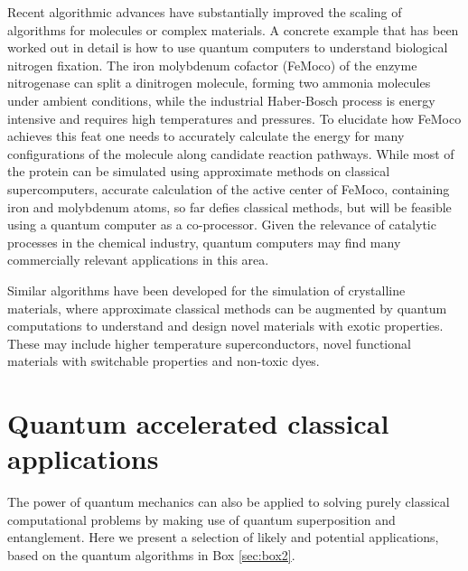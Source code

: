 \documentclass[journal]{IEEEtran}
\begin{document}
Recent algorithmic advances have substantially improved the scaling of algorithms for molecules or complex materials. A concrete example that has been worked out in detail  \cite{nitrogenase} is how to use quantum computers to understand biological nitrogen fixation. 
The iron molybdenum cofactor (FeMoco) of the enzyme nitrogenase can split a dinitrogen molecule, forming two ammonia molecules under ambient conditions, while the industrial Haber-Bosch process is energy intensive and requires high temperatures and pressures. %
To elucidate how FeMoco achieves this feat one needs to accurately calculate the energy for many configurations of the molecule 
along candidate reaction pathways. While most of the protein
can be simulated using approximate methods on classical supercomputers, accurate calculation of the active center of FeMoco,
containing iron and molybdenum atoms, %
so far defies classical methods, but will be feasible using a quantum computer as a co-processor.
Given the relevance of catalytic processes in the chemical industry, quantum computers may find many commercially relevant applications in this area.

Similar algorithms have been developed for the simulation of crystalline materials, where approximate classical 
methods 
can be augmented by quantum computations
to understand and design novel materials with exotic properties. These may include higher temperature superconductors, novel functional materials with switchable properties and non-toxic dyes. 


\section{Quantum accelerated classical applications}
The power of quantum mechanics can also be applied to solving purely classical computational problems by making use of quantum superposition and entanglement. Here we present a selection of likely and potential applications, based on the quantum algorithms in Box \ref{sec:box2}.
\end{document}
